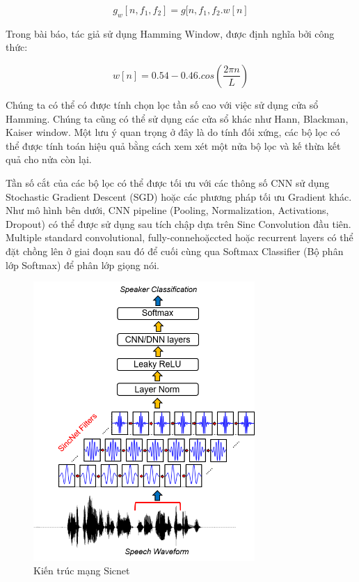 \documentclass{article}
\begin{document}
	$$g_{w}\left[n, f_1, f_2\right] = g[n, f_1, f_2 . w[n]$$
	
	Trong bài báo, tác giả sử dụng Hamming Window, được định nghĩa bởi công thức:
	
	$$w[n] = 0.54 - 0.46.cos(\frac{2\pi n}{L})$$
	
	
	Chúng ta có thể có được tính chọn lọc tần số cao với việc sử dụng cửa sổ Hamming. Chúng ta cũng có thể sử dụng các cửa sổ khác như Hann, Blackman, Kaiser window. Một lưu ý quan trọng ở đây là do tính đối xứng, các bộ lọc có thể được tính toán hiệu quả bằng cách xem xét một nửa bộ lọc và kế thừa kết quả cho nửa còn lại.
	
	Tần số cắt của các bộ lọc có thể được tối ưu với các thông số CNN sử dụng Stochastic Gradient Descent (SGD) hoặc các phương pháp tối ưu Gradient khác. Như mô hình bên dưới, CNN pipeline (Pooling, Normalization, Activations, Dropout) có thể được sử dụng sau tích chập dựa trên Sinc Convolution đầu tiên. Multiple standard convolutional, fully-connehoặccted hoặc recurrent layers có thể đặt chồng lên ở giai đoạn sau đó để cuối cùng qua Softmax Classifier (Bộ phân lớp Softmax) để phân lớp giọng nói.
	
	\begin{figure}[H]
		\centering
		\includegraphics[width=0.75\textwidth]{images/SincNet.png}
		\caption{Kiến trúc mạng Sicnet}
		\label{fig:writing-thesis}
	\end{figure}
	
\end{document}
